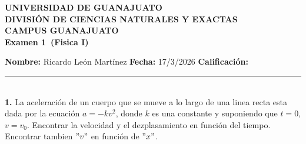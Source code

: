 \documentclass[12pt,a4paper]{article}
\newcommand{\alumno}{Ricardo León Martínez}
\newcommand{\materia}{Fisica I}
\newcommand{\tarea}{Examen 1}
\newcommand{\fecha}{17/3/2026}
\begin{document}
    \begin{center}
    {\large\textbf{UNIVERSIDAD DE GUANAJUATO}}\\[0.3cm]
    {\normalsize\textbf{DIVISIÓN DE CIENCIAS NATURALES Y EXACTAS}}\\
    {\normalsize\textbf{CAMPUS GUANAJUATO}}\\[1cm]

    {\Large\textbf{\tarea\ (\materia)}}\\[1cm]
    \end{center}

    \textbf{Nombre:} \alumno \hfill 
    \textbf{Fecha:} \fecha \hfill 
    \textbf{Calificación:} \rule{3cm}{0.4pt} \\[0.3cm]

    \textbf{1.} La aceleración de un cuerpo que se mueve a lo largo de una linea recta esta
    dada por la ecuación $a=-kv^{2}$, donde $k$ es una constante y suponiendo que $t=0$,
    $v=v_{0}$. Encontrar la velocidad y el dezplasamiento en función del tiempo. Encontrar
    tambien $"v"$ en función de $"x"$.
\end{document}
